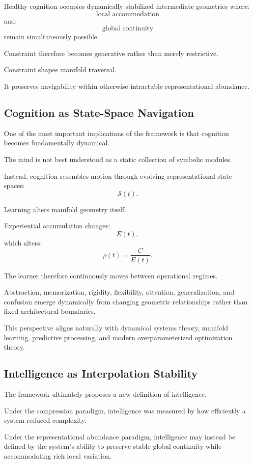 \documentclass[12pt,a4paper]{article}
\begin{document}
Healthy cognition occupies dynamically stabilized intermediate geometries where:
\[
\text{local accommodation}
\]
and:
\[
\text{global continuity}
\]
remain simultaneously possible.

Constraint therefore becomes generative rather than merely restrictive.

Constraint shapes manifold traversal.

It preserves navigability within otherwise intractable representational abundance.

\subsection{Cognition as State-Space Navigation}

One of the most important implications of the framework is that cognition becomes fundamentally dynamical.

The mind is not best understood as a static collection of symbolic modules.

Instead, cognition resembles motion through evolving representational state-spaces:
\[
\mathcal{S}(t).
\]

Learning alters manifold geometry itself.

Experiential accumulation changes:
\[
E(t),
\]
which alters:
\[
\rho(t)
=
\frac{C}{E(t)}.
\]

The learner therefore continuously moves between operational regimes.

Abstraction, memorization, rigidity, flexibility, attention, generalization, and confusion emerge dynamically from changing geometric relationships rather than fixed architectural boundaries.

This perspective aligns naturally with dynamical systems theory, manifold learning, predictive processing, and modern overparameterized optimization theory.

\subsection{Intelligence as Interpolation Stability}

The framework ultimately proposes a new definition of intelligence.

Under the compression paradigm, intelligence was measured by how efficiently a system reduced complexity.

Under the representational abundance paradigm, intelligence may instead be defined by the system's ability to preserve stable global continuity while accommodating rich local variation.
\end{document}
